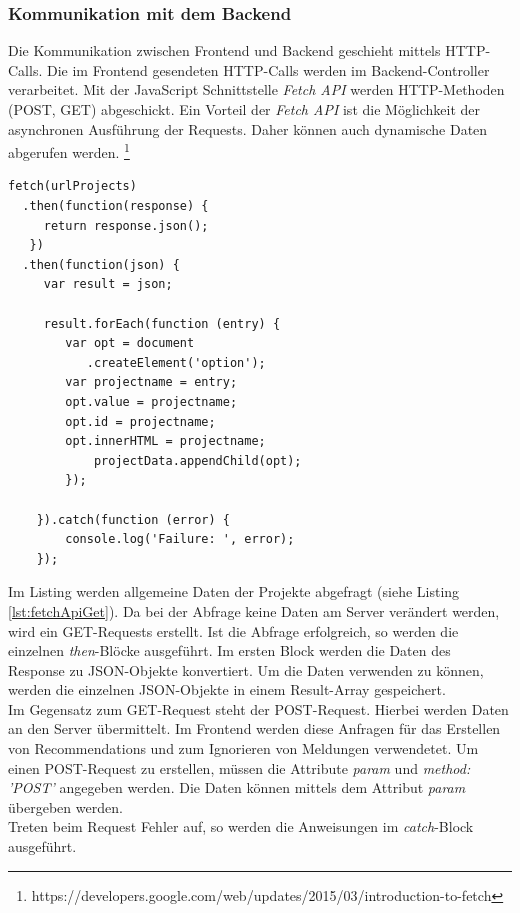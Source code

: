 \subsubsection{Kommunikation mit dem Backend}
Die Kommunikation zwischen Frontend und Backend geschieht mittels HTTP-Calls. Die im Frontend gesendeten HTTP-Calls werden im Backend-Controller verarbeitet.  Mit der JavaScript Schnittstelle \textit{Fetch API} werden HTTP-Methoden (POST, GET) abgeschickt. Ein Vorteil der  \textit{Fetch API} ist die Möglichkeit der asynchronen Ausführung der Requests. Daher können auch dynamische Daten abgerufen werden. \footnote{https://developers.google.com/web/updates/2015/03/introduction-to-fetch}
\lstset{
  caption={Erstellung eines GET-Request für Projektdaten mit der Schnittstelle Fetch API.}, 
  basicstyle=\small\ttfamily, 
  label=lst:fetchApiGet, 
  language=Java,
  frame=single,
  breaklines=true, %
  postbreak=\mbox{\textcolor{red}{$\hookrightarrow$}\space},
}

\begin{samepage}%
	\begin{lstlisting}[float=tbhp]
fetch(urlProjects)
  .then(function(response) {
     return response.json();
   })
  .then(function(json) {
     var result = json;
        
  	 result.forEach(function (entry) {
        var opt = document
           .createElement('option');
        var projectname = entry;
        opt.value = projectname;
        opt.id = projectname;
        opt.innerHTML = projectname;
            projectData.appendChild(opt);
        });
        
    }).catch(function (error) {
        console.log('Failure: ', error);
    });

	\end{lstlisting}
\end{samepage}

Im Listing werden allgemeine Daten der Projekte abgefragt (siehe Listing \ref{lst:fetchApiGet}). Da bei der Abfrage keine Daten am Server verändert werden, wird ein GET-Requests erstellt. Ist die Abfrage erfolgreich, so werden die einzelnen \textit{then}-Blöcke ausgeführt. Im ersten Block werden die Daten des Response zu JSON-Objekte konvertiert. Um die Daten verwenden zu können, werden die einzelnen JSON-Objekte in einem Result-Array gespeichert.  \\
Im Gegensatz zum GET-Request steht der POST-Request. Hierbei werden Daten an den Server übermittelt. Im Frontend werden diese Anfragen für das Erstellen von Recommendations und zum Ignorieren von Meldungen verwendetet. Um einen POST-Request zu erstellen, müssen die Attribute \textit{param} und \textit{method: 'POST'} angegeben werden. Die Daten können mittels dem Attribut \textit{param} übergeben werden. \\
Treten beim Request Fehler auf, so werden die Anweisungen im \textit{catch}-Block ausgeführt.

